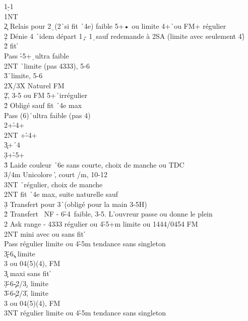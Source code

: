 \documentclass[a4paper]{article}
\begin{document}
\begin{bidtable}
1\d-1\s\\
1NT\+\\
2\c \> Relais pour 2\d\ (2\h\ si fit \h\ 4e) faible 5+• ou limite 4+\h\ ou FM+ régulier\+\\
2\d \> Dénie 4 \h\ idem départ 1\c\ - 1\d\ sauf redemande à 2SA (limite avec seulement 4\h )\\
2\h \> fit \h \+\\
Pass \h -5+\d\ ultra faible\\
2NT \h\ limite (pas 4333), 5-6\\
3\h {}\h\ limite, 5-6\\
2X/3X \> Naturel FM\-\-\\
2\d {}\h , 3-5 ou FM 5+\h\ irrégulier\+\\
2\h \> Obligé sauf fit \h\ 4e max\+\\
Pass (6)\h\ ultra faible (pas 4\s )\\
2\s {}+\h -4+\s \\
2NT +\h -4+\c \\
3\c {}+\h\ 4\d \\
3\d {}+\h -5+\d \\
3\h \> Laide couleur \h\ 6e sans courte, choix de manche ou TDC\\
3\s/4m \> Unicolore \h , court \s /m, 10-12\\
3NT \h\ régulier, choix de manche\-\\
2NT \> fit \h\ 4e max, suite naturelle sauf\+\\
3\d \> Transfert pour 3\h\ (obligé pour la main 3-5H)\-\-\\
2\h \> Transfert \s\ NF - 6\h -4\s\ faible, 3-5. L'ouvreur passe ou donne le plein\\
2\s \> Ask range - 4333 régulier ou 4\h -5+m limite ou 1444/0454 FM\+\\
2NT \> mini avec ou sans fit \h \+\\
Pass \> régulier limite ou 4\h -5m tendance sans singleton\\
3\c {}\h -6\c , limite\\
3\s {} ou 04(5)(4), FM\-\\
3\c \> maxi sans fit \h \+\\
3\d {}\h -6\c -2/3\d , limite\\
3\h {}\h -6\c -2/3\h , limite\\
3\s {} ou 04(5)(4), FM\\
3NT \> régulier limite ou 4\h -5m tendance sans singleton\-\\

\end{bidtable}
\end{document}
